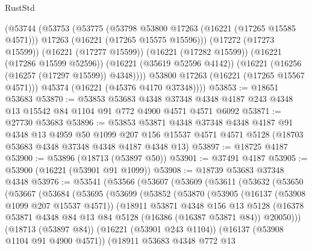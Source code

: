\begin{lexlean}{RustStd}
\begin{coremodule}
          (@53744
            (@53753
              (@53775
                (@53798 @53800 @17263 (@16221 (@17265 @15585 @4571)))
                @17263
                (@16221 (@17265 @15575 @15596)))
              (@17272 (@17273 @15599))
              (@16221 (@17277 @15599))
              (@16221 (@17282 @15599))
              (@16221 (@17286 @15599 @52596))
              (@16221 (@35619 @52596 @4142))
              (@16221 (@16256 (@16257 (@17297 @15599)) @4348))))
          @53800
          @17263
          (@16221 (@17265 @15567 @4571)))
        @45374
        (@16221 (@45376 @4170 @37348))))
@53853 := @18651 @53683
@53870 := @53853
    @53683
    @4348
    @37348
    @4348
    @4187
    @243
    @4348
    @13
    @15542
    @84
    @1104
    @91
    @772
    @4900
    @4571
    @4571
    @6092
@53871 := @27730 @53683
@53896 := @53853
    @53871
    @4348
    @37348
    @4348
    @4187
    @91
    @4348
    @13
    @4959
    @50
    @1099
    @207
    @156
    @15537
    @4571
    @4571
    @5128
    (@18703 @53683 @4348 @37348 @4348 @4187 @4348 @13)
@53897 := @18725 @4187
@53900 := @53896 (@18713 (@53897 @50))
@53901 := @37491 @4187
@53905 := @53900 (@16221 (@53901 @91 @1099))
@53908 := @18739 @53683 @37348 @4348
@53976 := @53541
    (@53566
      (@53607
        (@53609
          (@53611
            (@53632
              (@53650
                (@53667
                  (@53684
                    (@53695
                      (@53699
                        (@53852
                          (@53870
                            (@53905
                              (@16137 (@53908 @1099 @207 @15537 @4571))
                              (@18911
                                @53871
                                @4348
                                @156
                                @13
                                @5128
                                (@16378
                                  @53871
                                  @4348
                                  @84
                                  @13
                                  @84
                                  @5128
                                  (@16386 (@16387 @53871 @84))
                                  @20050)))
                            (@18713 (@53897 @84))
                            (@16221 (@53901 @243 @1104))
                            (@16137 (@53908 @1104 @91 @4900 @4571))
                            (@18911
                              @53683
                              @4348
                              @772
                              @13

\end{coremodule}
\end{lexlean}
